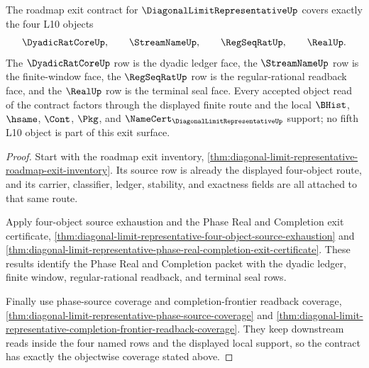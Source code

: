 \begin{theorem}
\label{thm:diagonal-limit-representative-exit-object-coverage}
The roadmap exit contract for $\DiagonalLimitRepresentativeUp$ covers exactly the four L10 objects
$$
\DyadicRatCoreUp,\qquad \StreamNameUp,\qquad \RegSeqRatUp,\qquad \RealUp.
$$
The $\DyadicRatCoreUp$ row is the dyadic ledger face, the $\StreamNameUp$ row is the finite-window face, the $\RegSeqRatUp$ row is the regular-rational readback face, and the $\RealUp$ row is the terminal seal face. Every accepted object read of the contract factors through the displayed finite route and the local $\BHist$, $\hsame$, $\Cont$, $\Pkg$, and $\NameCert_{\DiagonalLimitRepresentativeUp}$ support; no fifth L10 object is part of this exit surface.
\end{theorem}
\begin{proof}
Start with the roadmap exit inventory, \autoref{thm:diagonal-limit-representative-roadmap-exit-inventory}. Its source row is already the displayed four-object route, and its carrier, classifier, ledger, stability, and exactness fields are all attached to that same route.

Apply four-object source exhaustion and the Phase Real and Completion exit certificate, \autoref{thm:diagonal-limit-representative-four-object-source-exhaustion} and \autoref{thm:diagonal-limit-representative-phase-real-completion-exit-certificate}. These results identify the Phase Real and Completion packet with the dyadic ledger, finite window, regular-rational readback, and terminal seal rows.

Finally use phase-source coverage and completion-frontier readback coverage, \autoref{thm:diagonal-limit-representative-phase-source-coverage} and \autoref{thm:diagonal-limit-representative-completion-frontier-readback-coverage}. They keep downstream reads inside the four named rows and the displayed local support, so the contract has exactly the objectwise coverage stated above.
\end{proof}

